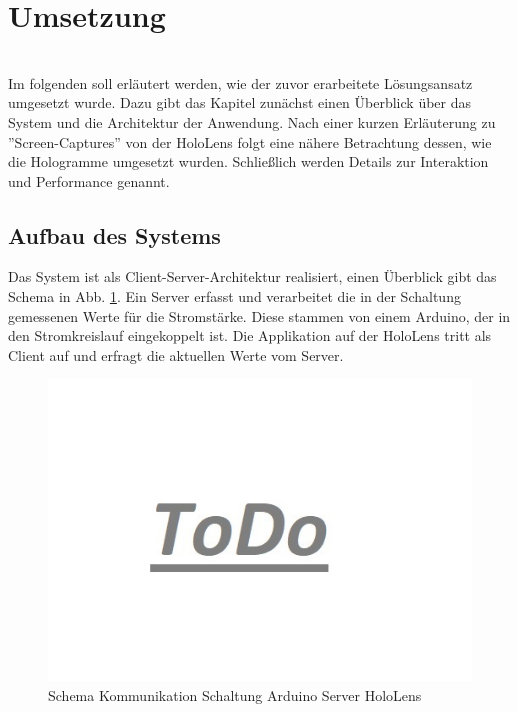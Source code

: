 \section{Umsetzung}
\label{sec-5}
\\

Im folgenden soll erläutert werden, wie der zuvor erarbeitete Lösungsansatz umgesetzt wurde. Dazu gibt das Kapitel zunächst einen Überblick über das System und die Architektur der Anwendung. Nach einer kurzen Erläuterung zu ''Screen-Captures'' von der HoloLens folgt eine nähere Betrachtung dessen, wie die Hologramme umgesetzt wurden. Schließlich werden Details zur Interaktion und Performance genannt.

\subsection{Aufbau des Systems}
Das System ist als Client-Server-Architektur realisiert, einen Überblick gibt das Schema in Abb. \ref{img:communication-schema}. Ein Server erfasst und verarbeitet die in der Schaltung gemessenen Werte für die Stromstärke. Diese stammen von einem Arduino, der in den Stromkreislauf eingekoppelt ist. Die Applikation auf der HoloLens tritt als Client auf und erfragt die aktuellen Werte vom Server. 
\begin{figure}[h!]
	\centering
	\includegraphics[width=1\textwidth]{images/todo.jpg}
	\caption{Schema Kommunikation Schaltung Arduino Server HoloLens}
	\label{img:communication-schema}
\end{figure}

